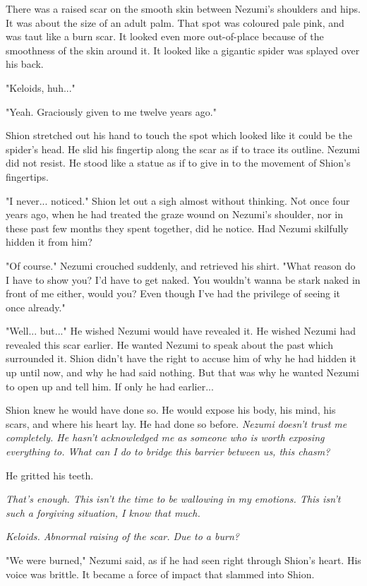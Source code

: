 There was a raised scar on the smooth skin between Nezumi's shoulders
and hips. It was about the size of an adult palm. That spot was coloured
pale pink, and was taut like a burn scar. It looked even more
out-of-place because of the smoothness of the skin around it. It looked
like a gigantic spider was splayed over his back.

"Keloids, huh..."

"Yeah. Graciously given to me twelve years ago."

Shion stretched out his hand to touch the spot which looked like it
could be the spider's head. He slid his fingertip along the scar as if
to trace its outline. Nezumi did not resist. He stood like a statue as
if to give in to the movement of Shion's fingertips.

"I never... noticed." Shion let out a sigh almost without thinking. Not
once four years ago, when he had treated the graze wound on Nezumi's
shoulder, nor in these past few months they spent together, did he
notice. Had Nezumi skilfully hidden it from him?

"Of course." Nezumi crouched suddenly, and retrieved his shirt. "What
reason do I have to show you? I'd have to get naked. You wouldn't wanna
be stark naked in front of me either, would you? Even though I've had
the privilege of seeing it once already."

"Well... but..." He wished Nezumi would have revealed it. He wished
Nezumi had revealed this scar earlier. He wanted Nezumi to speak about
the past which surrounded it. Shion didn't have the right to accuse him
of why he had hidden it up until now, and why he had said nothing. But
that was why he wanted Nezumi to open up and tell him. If only he had
earlier...

Shion knew he would have done so. He would expose his body, his mind,
his scars, and where his heart lay. He had done so before. \emph{Nezumi
	doesn't trust me completely. He hasn't acknowledged me as someone who is
	worth exposing everything to. What can I do to bridge this barrier
	between us, this chasm?}

He gritted his teeth.

\emph{That's enough. This isn't the time to be wallowing in my emotions. This
	isn't such a forgiving situation, I know that much.}

\emph{Keloids. Abnormal raising of the scar. Due to a burn?}

"We were burned," Nezumi said, as if he had seen right through Shion's
heart. His voice was brittle. It became a force of impact that slammed
into Shion.

